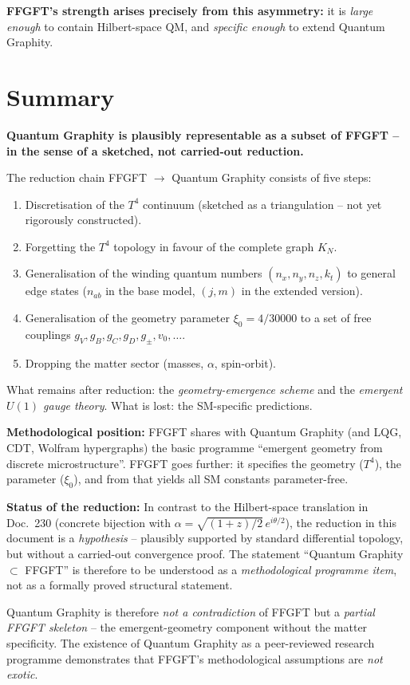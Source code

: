\textbf{FFGFT's strength arises precisely from this asymmetry:}
it is \emph{large enough} to contain Hilbert-space QM, and
\emph{specific enough} to extend Quantum Graphity.

\section{Summary}

\textbf{Quantum Graphity is plausibly representable as a subset of
FFGFT -- in the sense of a sketched, not carried-out reduction.}

The reduction chain FFGFT $\to$ Quantum Graphity consists of five
steps:
\begin{enumerate}[leftmargin=2em,itemsep=2pt,topsep=2pt]
  \item Discretisation of the $T^4$ continuum (sketched as a
        triangulation -- not yet rigorously constructed).
  \item Forgetting the $T^4$ topology in favour of the complete
        graph $K_N$.
  \item Generalisation of the winding quantum numbers
        $(n_x, n_y, n_z, k_t)$ to general edge states ($n_{ab}$ in
        the base model, $(j, m)$ in the extended version).
  \item Generalisation of the geometry parameter
        $\xi_0 = 4/30000$ to a set of free couplings $g_V, g_B,
        g_C, g_D, g_\pm, v_0, \ldots$.
  \item Dropping the matter sector (masses, $\alpha$, spin-orbit).
\end{enumerate}

What remains after reduction: the \emph{geometry-emergence scheme}
and the \emph{emergent $U(1)$ gauge theory}. What is lost: the
SM-specific predictions.

\textbf{Methodological position:} FFGFT shares with Quantum Graphity
(and LQG, CDT, Wolfram hypergraphs) the basic programme
\enquote{emergent geometry from discrete microstructure}. FFGFT
goes further: it specifies the geometry ($T^4$), the parameter
($\xi_0$), and from that yields all SM constants parameter-free.

\textbf{Status of the reduction:} In contrast to the Hilbert-space
translation in Doc.~230 (concrete bijection with
$\alpha = \sqrt{(1+z)/2}\,e^{i\theta/2}$), the reduction in this
document is a \emph{hypothesis} -- plausibly supported by standard
differential topology, but without a carried-out convergence proof.
The statement \enquote{Quantum Graphity $\subset$ FFGFT} is therefore
to be understood as a \emph{methodological programme item}, not as
a formally proved structural statement.

Quantum Graphity is therefore \emph{not a contradiction} of FFGFT
but a \emph{partial FFGFT skeleton} -- the emergent-geometry
component without the matter specificity. The existence of Quantum
Graphity as a peer-reviewed research programme demonstrates that
FFGFT's methodological assumptions are \emph{not exotic}.
